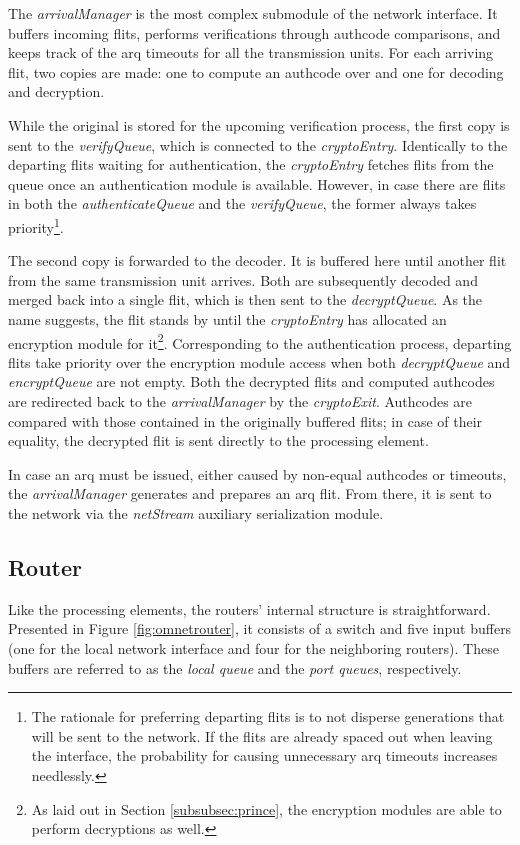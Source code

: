 The \textit{arrivalManager} is the most complex submodule of the network interface. It buffers incoming flits, performs verifications through authcode
comparisons, and keeps track of the \gls{arq} timeouts for all the transmission units. For each arriving flit, two copies are made: one to compute an
authcode over and one for decoding and decryption.

While the original is stored for the upcoming verification process, the first copy is sent to the
\textit{verifyQueue}, which is connected to the \textit{cryptoEntry}. Identically to the departing flits waiting for authentication, the
\textit{cryptoEntry} fetches flits from the queue once an authentication module is available. However, in case there are flits in both the
\textit{authenticateQueue} and the \textit{verifyQueue}, the former always takes priority\footnote{The rationale for preferring departing flits is to
not disperse generations that will be sent to the network. If the flits are already spaced out when leaving the interface, the probability for causing
unnecessary \gls{arq} timeouts increases needlessly.}.

The second copy is forwarded to the decoder. It is buffered here until another flit from the
same transmission unit arrives. Both are subsequently decoded and merged back into a single flit, which is then sent to the \textit{decryptQueue}. As
the name suggests, the flit stands by until the \textit{cryptoEntry} has allocated an encryption module for it\footnote{As laid out in Section
\ref{subsubsec:prince}, the encryption modules are able to perform decryptions as well.}. Corresponding to the authentication process, departing flits
take priority over the encryption module access when both \textit{decryptQueue} and \textit{encryptQueue} are not empty. Both the decrypted flits and
computed authcodes are redirected back to the \textit{arrivalManager} by the \textit{cryptoExit}. Authcodes are compared with those contained in the
originally buffered flits; in case of their equality, the decrypted flit is sent directly to the processing element.

In case an \gls{arq} must be issued, either caused by non-equal authcodes or timeouts, the \textit{arrivalManager} generates and prepares an
\gls{arq} flit. From there, it is sent to the network via the \textit{netStream} auxiliary serialization module.

\subsection{Router}\label{subsec:routerimpl}
Like the processing elements, the routers' internal structure is straightforward. Presented in Figure \vref{fig:omnetrouter}, it consists of a switch
and five input buffers (one for the local network interface and four for the neighboring routers). These buffers are referred to as the \textit{local
queue} and the \textit{port queues}, respectively.

